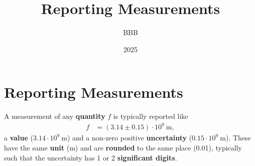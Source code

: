 \documentclass{article}
\title{Reporting Measurements}
\author{BBB}
\date{2025}
\begin{document}
\pagestyle{empty} %

\centering

\setlength\extrarowheight{3pt}

\begin{minipage}[t][18cm][c]{11cm}


\section{\Huge Reporting Measurements}


A measurement of any \textbf{quantity} $f$ is typically reported like
\begin{align*}
    f & = (3.14 \pm 0.15) \cdot 10^9 \: \text{m},
\end{align*}
a \textbf{value} ($3.14 \cdot 10^9 \: \text{m}$) and a non-zero positive \textbf{uncertainty} ($0.15 \cdot 10^9 \: \text{m}$). These have the same \textbf{unit} ($\text{m}$) and are \textbf{rounded} to the same place (0.01), typically such that the uncertainty has 1 or 2 \textbf{significant digits}.\bigskip



\end{minipage}
\end{document}
